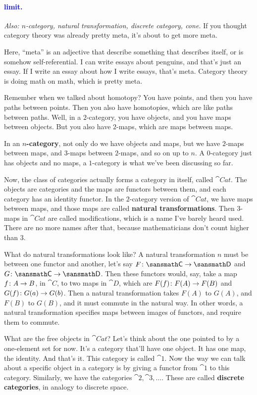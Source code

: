 \documentclass[11pt,paper=letter]{scrartcl}
\renewcommand\wp[1]{\paragraph{\textcolor{Blue}{#1.}} \hspace{-1em}}
\newcommand\wl[1]{\label{w:#1}}
\newcommand\oww[1]{\textit{Also: #1.}}
\begin{document}
\wp{limit}
\wl{limit}
\oww{$n$-category, natural transformation, discrete category, cone}
If you thought category theory was already pretty meta, it's about to get more meta.

\begin{remboxed}
  Here, ``meta'' is an adjective that describe something that describes itself, or is somehow self-referential. I can write essays about penguins, and that's just an essay. If I write an essay about how I write essays, that's meta. Category theory is doing math on math, which is pretty meta.
\end{remboxed}

Remember when we talked about homotopy? You have points, and then you have paths between points. Then you also have homotopies, which are like paths between paths. Well, in a $2$-category, you have objects, and you have maps between objects. But you also have $2$-maps, which are maps between maps.

In an \textbf{$n$-category}, not only do we have objects and maps, but we have $2$-maps between maps, and $3$-maps between $2$-maps, and so on up to $n$. A $0$-category just has objects and no maps, a $1$-category is what we've been discussing so far.

Now, the class of categories actually forms a category in itself, called $\cat{Cat}$. The objects are categories and the maps are functors between them, and each category has an identity functor. In the $2$-category version of $\cat{Cat}$, we have maps between maps, and those maps are called \textbf{natural transformations}. Then $3$-maps in $\cat{Cat}$ are called modifications, which is a name I've barely heard used. There are no more names after that, because mathematicians don't count higher than $3$.

What do natural transformations look like? A natural transformation $n$ must be between one functor and another, let's say $F \from \cat{C} \to \cat {D}$ and $G \from \cat{C} \to \cat{D}$. Then these functors would, say, take a map $f \colon A \to B$, in $\cat{C}$, to two maps in $\cat{D}$, which are $F(f) \colon F(A) \to F(B)$ and $G(f) \colon G(a) \to G(b)$. Then a natural transformation takes $F(A)$ to $G(A)$, and $F(B)$ to $G(B)$, and it must commute in the natural way. In other words, a natural transformation specifies maps between images of functors, and require them to commute.

What are the free objects in $\cat{Cat}$? Let's think about the one pointed to by a one-element set for now. It's a category that'll have one object. It has one map, the identity. And that's it. This category is called $\cat{1}$. Now the way we can talk about a specific object in a category is by giving a functor from $\cat{1}$ to this category. Similarly, we have the categories $\cat{2}, \cat{3}, \dots$. These are called \textbf{discrete categories}, in analogy to discrete space.
\end{document}
